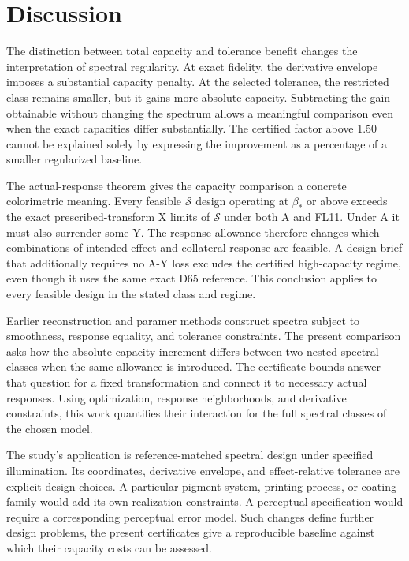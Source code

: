 \documentclass{optica-article}
\begin{document}
\section{Discussion}
The distinction between total capacity and tolerance benefit changes the interpretation of spectral regularity. At exact fidelity, the derivative envelope imposes a substantial capacity penalty. At the selected tolerance, the restricted class remains smaller, but it gains more absolute capacity. Subtracting the gain obtainable without changing the spectrum allows a meaningful comparison even when the exact capacities differ substantially. The certified factor above 1.50 cannot be explained solely by expressing the improvement as a percentage of a smaller regularized baseline.

The actual-response theorem gives the capacity comparison a concrete colorimetric meaning. Every feasible $\mathcal S$ design operating at $\beta_*$ or above exceeds the exact prescribed-transform X limits of $\mathcal S$ under both A and FL11. Under A it must also surrender some Y. The response allowance therefore changes which combinations of intended effect and collateral response are feasible. A design brief that additionally requires no A-Y loss excludes the certified high-capacity regime, even though it uses the same exact D65 reference. This conclusion applies to every feasible design in the stated class and regime.

Earlier reconstruction and paramer methods construct spectra subject to smoothness, response equality, and tolerance constraints. The present comparison asks how the absolute capacity increment differs between two nested spectral classes when the same allowance is introduced. The certificate bounds answer that question for a fixed transformation and connect it to necessary actual responses. Using optimization, response neighborhoods, and derivative constraints, this work quantifies their interaction for the full spectral classes of the chosen model.

The study's application is reference-matched spectral design under specified illumination. Its coordinates, derivative envelope, and effect-relative tolerance are explicit design choices. A particular pigment system, printing process, or coating family would add its own realization constraints. A perceptual specification would require a corresponding perceptual error model. Such changes define further design problems, the present certificates give a reproducible baseline against which their capacity costs can be assessed.
\end{document}
